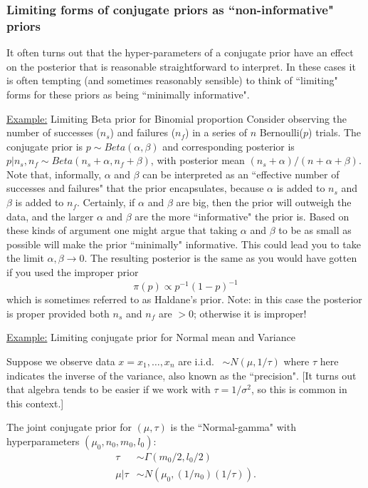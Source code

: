 \documentclass[12pt]{article}
\def\ni{\noindent}
\begin{document}
\subsubsection{Limiting forms of conjugate priors as ``non-informative" priors}

It often turns out that the hyper-parameters of a conjugate prior have an effect on the posterior
that is reasonable straightforward to interpret. In these cases it is often tempting (and sometimes
reasonably sensible) to think of ``limiting" forms for these priors as being ``minimally informative". 

\ni\underline{Example:} Limiting Beta prior for Binomial proportion
\vskip 2mm
Consider observing the number of successes ($n_s$) and failures ($n_f$)
in a series of $n$ Bernoulli($p$) trials. 
The conjugate prior is $p \sim Beta(\alpha, \beta)$
and corresponding posterior is $p | n_s,n_f \sim Beta(n_s+ \alpha, n_f + \beta)$, with posterior mean $(n_s+\alpha)/(n+\alpha+\beta)$. Note that,
informally, $\alpha$ and $\beta$ can be interpreted as an ``effective number of successes and failures" that the prior encapsulates, because $\alpha$ is added to $n_s$ and $\beta$ is added to $n_f$. Certainly, if $\alpha$ and $\beta$ are big, then the prior will outweigh the data, and the larger $\alpha$ and $\beta$ are the more ``informative" the prior is. Based on these kinds of  argument one might argue that taking $\alpha$ and $\beta$ to be as small as possible will make the prior ``minimally" informative. This could lead you to take the limit $\alpha, \beta \rightarrow 0$. The resulting posterior is the same as you would have gotten if you used the improper prior $$\pi(p) \propto p^{-1} (1-p)^{-1}$$ which is sometimes referred to as Haldane's prior. Note: in this case the posterior is proper provided both $n_s$ and $n_f$ are $>0$; otherwise it is improper!

\ni\underline{Example:} Limiting conjugate prior for Normal mean and Variance
\vskip 2mm

Suppose we observe data $x=x_1,\dots,x_n$ are i.i.d.~ $\sim N(\mu,1/\tau)$ where $\tau$ here indicates the inverse of the variance, also known as the ``precision". [It turns out that algebra tends to be easier if we work with $\tau=1/\sigma^2$, so this is common in this context.]

The joint conjugate prior for $(\mu,\tau)$ is 
the ``Normal-gamma" with hyperparameters $(\mu_0,n_0, m_0,l_0)$:
\begin{align}
\tau  & \sim \Gamma(m_0/2,l_0/2) \\
\mu | \tau  & \sim N\left(\mu_0, (1/n_0) (1/\tau)\right).
\end{align}
\end{document}
